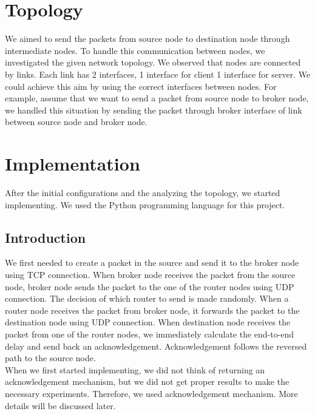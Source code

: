 \documentclass[conference]{IEEEtran}
\begin{document}
\section{Topology}
We aimed to send the packets from source node to destination node through intermediate nodes. To handle this communication between nodes, we investigated the given network topology. We observed that nodes are connected by links. Each link has 2 interfaces, 1 interface for client 1 interface for server. We could achieve this aim by using the correct interfaces between nodes. For example, assume that we want to send a packet from source node to broker node, we handled this situation by sending the packet through broker interface of link between source node and broker node.

\section{Implementation}
After the initial configurations and the analyzing the topology, we started implementing. We used the Python programming language for this project.
\subsection{Introduction}
We first needed to create a packet in the source and send it to the broker node using TCP connection. When broker node receives the packet from the source node, broker node sends the packet to the one of the router nodes using UDP connection. The decision of which router to send is made randomly. When a router node receives the packet from broker node, it forwards the packet to the destination node using UDP connection. When destination node receives the packet from one of the router nodes, we immediately calculate the end-to-end delay and send back an acknowledgement. Acknowledgement follows the reversed path to the source node. \\
When we first started implementing, we did not think of returning an acknowledgement mechanism, but we did not get proper results to make the necessary experiments. Therefore, we used acknowledgement mechanism. More details will be discussed later.
\end{document}
